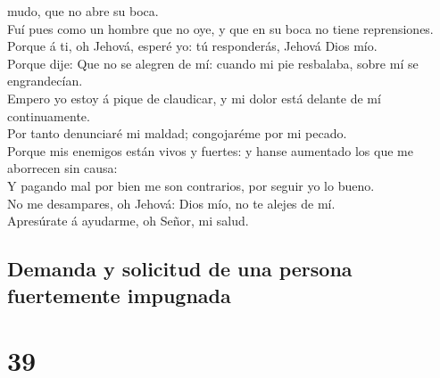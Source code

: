 mudo, que no abre su boca.\\
 Fuí pues como un hombre que no oye, y que en su boca no
tiene reprensiones.\\
 Porque á ti, oh Jehová, esperé yo: tú responderás,
Jehová Dios mío.\\
 Porque dije: Que no se alegren de mí: cuando mi pie
resbalaba, sobre mí se engrandecían.\\
 Empero yo estoy á pique de claudicar, y mi dolor está
delante de mí continuamente.\\
 Por tanto denunciaré mi maldad; congojaréme por mi
pecado.\\
 Porque mis enemigos están vivos y fuertes: y hanse
aumentado los que me aborrecen sin causa:\\
 Y pagando mal por bien me son contrarios, por seguir yo
lo bueno.\\
 No me desampares, oh Jehová: Dios mío, no te alejes de
mí.\\
 Apresúrate á ayudarme, oh Señor, mi salud.

\hypertarget{demanda-y-solicitud-de-una-persona-fuertemente-impugnada}{%
\subsection{Demanda y solicitud de una persona fuertemente
impugnada}\label{demanda-y-solicitud-de-una-persona-fuertemente-impugnada}}

\hypertarget{section-19-39}{%
\section{39}\label{section-19-39}}

